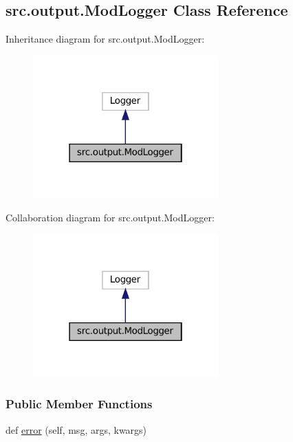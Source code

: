 \hypertarget{classsrc_1_1output_1_1ModLogger}{}\subsection{src.\+output.\+Mod\+Logger Class Reference}
\label{classsrc_1_1output_1_1ModLogger}


Inheritance diagram for src.\+output.\+Mod\+Logger\+:
\nopagebreak
\begin{figure}[H]
\begin{center}
\leavevmode
\includegraphics[width=202pt]{classsrc_1_1output_1_1ModLogger__inherit__graph}
\end{center}
\end{figure}


Collaboration diagram for src.\+output.\+Mod\+Logger\+:
\nopagebreak
\begin{figure}[H]
\begin{center}
\leavevmode
\includegraphics[width=202pt]{classsrc_1_1output_1_1ModLogger__coll__graph}
\end{center}
\end{figure}
\subsubsection*{Public Member Functions}
\begin{DoxyCompactItemize}
\item 
def \hyperlink{classsrc_1_1output_1_1ModLogger_a4ae03cf66a4295583f1066e7ec114ecb}{error} (self, msg, args, kwargs)
\end{DoxyCompactItemize}


